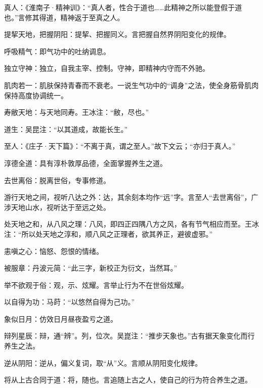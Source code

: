 \documentclass[draft,12pt]{ctexbook}
\begin{document}
\begin{jiaozhu}
	\item 真人：《淮南子·精神训》：“真人者，性合于道也……此精神之所以能登假于道也。”言修其得道，精神返于至真之人。
	\item 提挈天地，把握阴阳：提挈、把握同义。言把握自然界阴阳变化的规侓。
	\item 呼吸精气：即气功中的吐纳调息。
	\item 独立守神：独立，自我主宰、控制。守神，即精神内守而不外驰。
	\item 肌肉若一：肌肤保持青春而不衰老。一说生气功中的“调身”之法，使全身筋骨肌肉保持高度协调统一。
	\item 寿敝天地：与天地同寿。王冰注：“敝，尽也。”
	\item 道生：吴昆注：“以其道成，故能长生。”
	\item 至人：《庄子·天下篇》：“不离于真，谓之至人。”故下文云；“亦归于真人。”
	\item 淳德全道：具有淳朴敦厚品德，全面掌握养生之道。
	\item 去世离俗：脱离世俗，专事修道。
	\item 游行天地之间，视听八达之外：达，其余刻本均作“远”字。言至人“去世离俗”，广涉天地山水，视听达于至远之处。
	\item 处天地之和，从八风之理：八风，即四正四隅八方之风，各有节气相应而至。王冰注：“所以处天地之淳和，顺八风之正理者，欲其养正，避彼虚邪。”
	\item 恚嗔之心：恼怒、怨恨的情绪。
	\item 被服章：丹波元简：“此三字，新校正为衍文，当然耳。”
	\item 举不欲观于俗：观，示、炫耀。言举止行为不在世俗炫耀。
	\item 以自得为功：马莳：“以悠然自得为己功。”
	\item 象似日月：仿效日月昼夜盈亏之道。
	\item 辩列星辰：辩，通“辨”。列，位次。吴崑注：“推步天象也。”古有据天象变化而行养生之法。
	\item 逆从阴阳：逆从，偏义复词，取“从”义。言顺从阴阳变化规律。
	\item 将从上古合同于道：将，随也。言追随上古之人，使自己的行为符合养生之道。
\end{jiaozhu}


\end{document}
